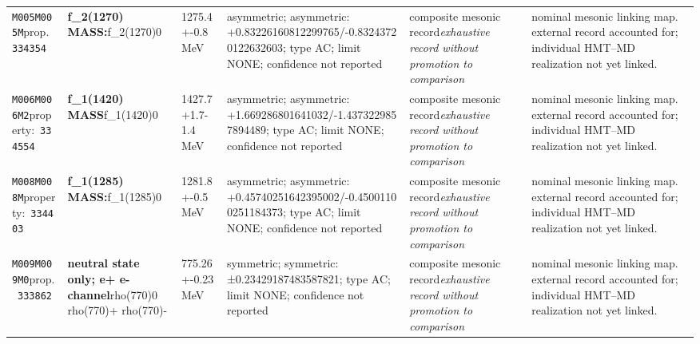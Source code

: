 \begin{landscape}
\begin{longtable}{L{1.85cm}L{4.45cm}L{2.35cm}L{4.05cm}L{3.35cm}L{7.15cm}}
\texttt{M005}\newline \texttt{M005M}\newline prop.\ \texttt{334354} & \textbf{f\_\allowbreak{}2(1270) MASS:}\newline f\_\allowbreak{}2(1270)0 & 1275.4+-0.8\,MeV & asymmetric; asymmetric: +0.83226160812299765/-0.83243720122632603; type AC; limit NONE; confidence not reported & composite mesonic record\newline \emph{exhaustive record without promotion to comparison} & nominal mesonic linking map. external record accounted for; individual HMT--MD realization not yet linked. \\
\texttt{M006}\newline \texttt{M006M2}\newline property:\ \texttt{334554} & \textbf{f\_\allowbreak{}1(1420) MASS}\newline f\_\allowbreak{}1(1420)0 & 1427.7+1.7-1.4\,MeV & asymmetric; asymmetric: +1.669286801641032/-1.4373229857894489; type AC; limit NONE; confidence not reported & composite mesonic record\newline \emph{exhaustive record without promotion to comparison} & nominal mesonic linking map. external record accounted for; individual HMT--MD realization not yet linked. \\
\texttt{M008}\newline \texttt{M008M}\newline property:\ \texttt{334403} & \textbf{f\_\allowbreak{}1(1285) MASS:}\newline f\_\allowbreak{}1(1285)0 & 1281.8+-0.5\,MeV & asymmetric; asymmetric: +0.45740251642395002/-0.45001100251184373; type AC; limit NONE; confidence not reported & composite mesonic record\newline \emph{exhaustive record without promotion to comparison} & nominal mesonic linking map. external record accounted for; individual HMT--MD realization not yet linked. \\
\texttt{M009}\newline \texttt{M009M0}\newline prop.\ \texttt{333862} & \textbf{neutral state only; e+ e- channel}\newline rho(770)0 \textbar{}\allowbreak{} rho(770)+ \textbar{}\allowbreak{} rho(770)- & 775.26+-0.23\,MeV & symmetric; symmetric: ±0.23429187483587821; type AC; limit NONE; confidence not reported & composite mesonic record\newline \emph{exhaustive record without promotion to comparison} & nominal mesonic linking map. external record accounted for; individual HMT--MD realization not yet linked. \\

\end{longtable}
\end{landscape}
